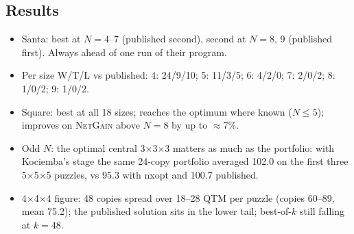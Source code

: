 \documentclass[10.5pt,a4paper]{article}
\newcommand{\Cu}[1]{#1$\times$#1$\times$#1}
\newcommand{\M}[1]{\textsc{#1}}
\begin{document}
\subsection{Results}
\begin{itemize}
\item Santa: best at $N=4$--7 (published second), second at $N=8$, 9 (published first). Always ahead of one run of their program.
\item Per size W/T/L vs published: 4: 24/9/10; 5: 11/3/5; 6: 4/2/0; 7: 2/0/2; 8: 1/0/2; 9: 1/0/2.
\item Square: best at all 18 sizes; reaches the optimum where known ($N\le5$); improves on \M{NetGain} above $N=8$ by up to $\approx$7\%.
\item Odd $N$: the optimal central \Cu{3} matters as much as the portfolio: with Kociemba's stage the same 24-copy portfolio averaged
102.0 on the first three \Cu{5} puzzles, vs 95.3 with nxopt and 100.7 published.
\item \Cu{4} figure: 48 copies spread over 18--28 QTM per puzzle (copies 60--89, mean 75.2); the published solution sits in the
lower tail; best-of-$k$ still falling at $k=48$.
\end{itemize}
\end{document}
